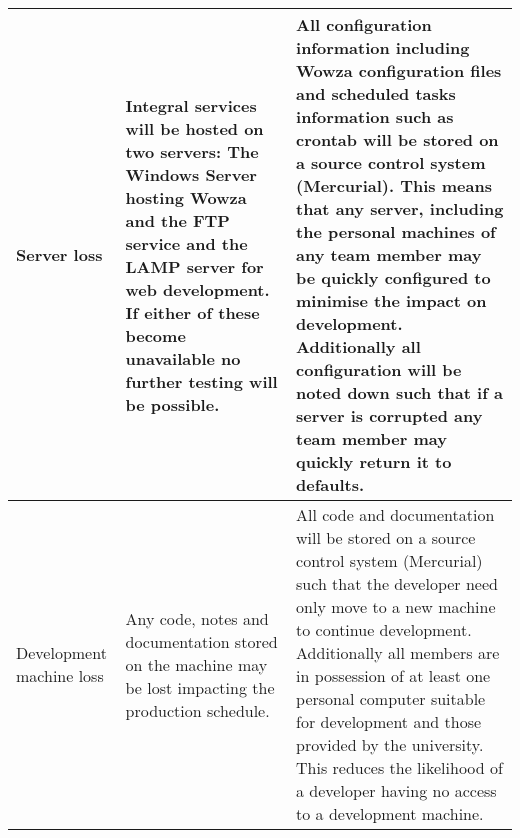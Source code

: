 \begin{center}
\begin{landscape}
\begin{longtable}{|p{3cm}|p{7cm}|p{12cm}|}
        Server loss                                      & Integral services will be hosted on two servers: The Windows Server hosting Wowza and the FTP service and the LAMP server for web development. If either of these become unavailable no further testing will be possible.                                                                                                                                                    & All configuration information including Wowza configuration files and scheduled tasks information such as crontab will be stored on a source control system (Mercurial). This means that any server, including the personal machines of any team member may be quickly configured to minimise the impact on development. Additionally all configuration will be noted down such that if a server is corrupted any team member may quickly return it to defaults.                                                                                                                                                                                                                                                                                                                                                                                                                                                                                                                                                                         \\ \hline
        Development machine loss                         & Any code, notes and documentation stored on the machine may be lost impacting the production schedule.                                                                                                                                                                                                                                                                       & All code and documentation will be stored on a source control system (Mercurial) such that the developer need only move to a new machine to continue development. Additionally all members are in possession of at least one personal computer suitable for development and those provided by the university. This reduces the likelihood of a developer having no access to a development machine.                                                                                                                                                                                                                                                                                                                                                                                                                                                                                                                                                                                                                                      \\ \hline

\end{longtable}
\end{landscape}
\end{center}
